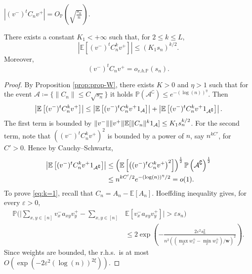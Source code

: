 \documentclass[10pt,a4paper]{amsart}
\newcommand{\E}{\mathbb{E}}
\newcommand{\Op}{O_{\p}}
\newcommand{\centered}{C_n}
\newcommand{\eps}{\varepsilon}
\newcommand{\ohp}{o_{v.h.\p}}
\newcommand{\one}{\textup{\textbf{1}}}
\newcommand{\p}{\mathbb{P}}
\newcommand{\rhs}{{r.h.s.~}}
\newcommand{\scaling}{s_n}
\newcommand{\w}{\boldsymbol{w}}
\newcommand{\x}{{{v}}^+}
\newcommand{\y}{{{v}}^-}
\begin{document}
\begin{lemma}  \label{lem:5}
        $| (\y)^t \centered \x | = \Op\left( \sqrt{\frac{\scaling}{n}}\right).$
\end{lemma}

\begin{lemma} \label{lem:1}
There exists a constant $K_1<+\infty$ such that, for $2\le k \le L$,
\begin{equation}
    \left|\E \left[(\y)^t\centered^k\x\right]\right| \le \left(K_1 \scaling\right)^{k/2}.
\end{equation}
Moreover, 
\begin{equation} \label{eq:k=1}
(\y)^t \centered \x = \ohp( \scaling).\end{equation}
\begin{proof}
By Proposition \ref{prop:prop-W}, there exists $K>0$ and $\eta>1$ such that for the event $\mathcal{A}\coloneq \{\|\centered\|\le C\sqrt{\scaling}\}$ it holds $\p(\mathcal{A}^\complement)\le e^{-(\log(n))^\eta}$. Then
\begin{equation}
    \left|\E\left[(\y)^t \centered^k \x \right]\right|\le     
    \left|\E\left[(\y)^t \centered^k \x \one_{\mathcal{A}} \right]\right|
    + \left|\E\left[(\y)^t \centered^k \x \one_{\mathcal{A}^\complement} \right]\right|.
\end{equation}
The first term is bounded by  $\|v^-\|\|v^+\|\E[\|\centered\|^k\one_{\mathcal A}] \le K_1\scaling^{{k}/2}$. For the second term, note that $\left((\y)^t \centered^k \x\right)^2$ is bounded by a power of $n$, say $n^{kC'}$, for $C'>0$. Hence by Cauchy--Schwartz,
\begin{align*}
    \left|\E\left[(\y)^t \centered^k \x \one_{\mathcal{A}^\complement} \right]\right|
    &  \le \left(\E\left[\left((\y)^t \centered^k \x\right)^2\right]\right)^{\frac12}\p\left({\mathcal{A}^\complement}\right)^{\frac12} \\
    & \le n^{kC'/2}e^{-(\log(n))^\eta/2}=o(1).
\end{align*}
To prove \eqref{eq:k=1}, recall that $\centered=A_n-\E[A_n]$. Hoeffding  inequality gives,  for every $\eps>0$,
\begin{equation}
\begin{split}
    \p
    \Bigg(\Bigg|\sum_{x,y \in [n]}v_x^- a_{xy} v_y^+-\sum_{x,y \in [n]}&\E\left[v_x^- a_{xy} v_y^+\right]\Bigg|> \eps\scaling\Bigg)\\ &\le 2 \exp \left(-\frac{2\eps^2 \scaling^2}{n^2 ((\max_{x} w_x^\pm-\min_x w_x^\pm)/\w)^2}\right).
    \end{split}
\end{equation}
Since weights are bounded, the \rhs is at most $O(\exp(-2\eps^2(\log(n))^{2\xi}))$.
\end{proof}
\end{lemma}
\end{document}
